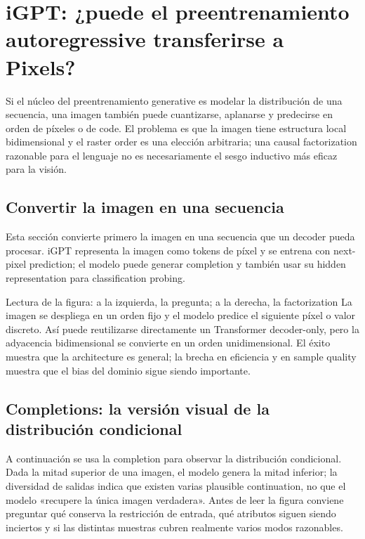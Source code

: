 \section{iGPT: ¿puede el preentrenamiento autoregressive transferirse a Pixels?}

Si el núcleo del preentrenamiento generative es modelar la distribución de una secuencia, una imagen también puede cuantizarse, aplanarse y predecirse en orden de píxeles o de code. El problema es que la imagen tiene estructura local bidimensional y el raster order es una elección arbitraria; una causal factorization razonable para el lenguaje no es necesariamente el sesgo inductivo más eficaz para la visión.

\subsection{Convertir la imagen en una secuencia}

Esta sección convierte primero la imagen en una secuencia que un decoder pueda procesar. iGPT representa la imagen como tokens de píxel y se entrena con next-pixel prediction; el modelo puede generar completion y también usar su hidden representation para classification probing.


\begin{knowledgebox}{Lectura de la figura: a la izquierda, la pregunta; a la derecha, la factorization}
La imagen se despliega en un orden fijo y el modelo predice el siguiente píxel o valor discreto. Así puede reutilizarse directamente un Transformer decoder-only, pero la adyacencia bidimensional se convierte en un orden unidimensional. El éxito muestra que la architecture es general; la brecha en eficiencia y en sample quality muestra que el bias del dominio sigue siendo importante.
\end{knowledgebox}

\subsection{Completions: la versión visual de la distribución condicional}

A continuación se usa la completion para observar la distribución condicional. Dada la mitad superior de una imagen, el modelo genera la mitad inferior; la diversidad de salidas indica que existen varias plausible continuation, no que el modelo «recupere la única imagen verdadera». Antes de leer la figura conviene preguntar qué conserva la restricción de entrada, qué atributos siguen siendo inciertos y si las distintas muestras cubren realmente varios modos razonables.

